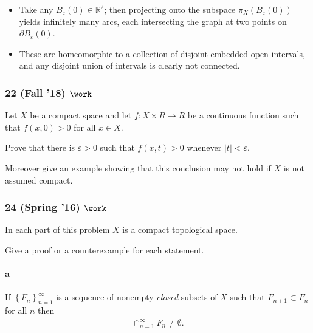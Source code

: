 \begin{solution}
\begin{itemize}
  \begin{itemize}
  \tightlist
  \item
    Take any \(B_\varepsilon(0) \in {\mathbb{R}}^2\); then projecting
    onto the subspace \(\pi_X(B_\varepsilon(0))\) yields infinitely many
    arcs, each intersecting the graph at two points on
    \({{\partial}}B_\varepsilon(0)\).
  \item
    These are homeomorphic to a collection of disjoint embedded open
    intervals, and any disjoint union of intervals is clearly not
    connected.
  \end{itemize}
\end{itemize}

\end{solution}

\hypertarget{fall-18-work}{%
\subsubsection{\texorpdfstring{22 (Fall '18)
\(\work\)}{22 (Fall '18) \textbackslash work}}\label{fall-18-work}}

Let \(X\) be a compact space and let \(f : X \times R \to R\) be a
continuous function such that \(f (x, 0) > 0\) for all \(x \in X\).

Prove that there is \(\varepsilon> 0\) such that \(f (x, t) > 0\)
whenever \({\left\lvert {t} \right\rvert} < \varepsilon\).

Moreover give an example showing that this conclusion may not hold if
\(X\) is not assumed compact.

\hypertarget{spring-16-work}{%
\subsubsection{\texorpdfstring{24 (Spring '16)
\(\work\)}{24 (Spring '16) \textbackslash work}}\label{spring-16-work}}

In each part of this problem \(X\) is a compact topological space.

Give a proof or a counterexample for each statement.

\hypertarget{a-4}{%
\paragraph{a}\label{a-4}}

If \(\left\{{F_n }\right\}_{n=1}^\infty\) is a sequence of nonempty
\emph{closed} subsets of \(X\) such that \(F_{n+1} \subset F_{n}\) for
all \(n\) then
\begin{align*}\cap^\infty_{n=1} F_n\neq \emptyset.\end{align*}

